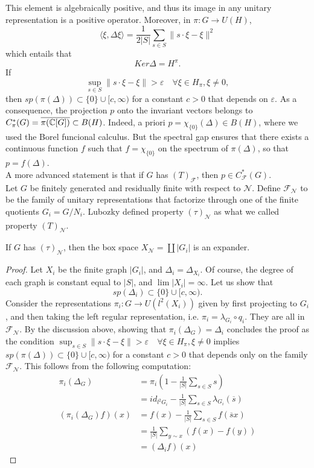 This element is algebraically positive, and thus its image in any unitary representation is a positive operator. Moreover, in $\pi : G\rightarrow U(H)$,
\[ \langle \xi , \Delta \xi \rangle = \frac{1}{2|S|} \sum_{s\in S} \|s\cdot \xi - \xi\|^2 \]
which entails that 
\[Ker \Delta = H^\pi.\]
If 
\[\sup_{s\in S} \|s\cdot \xi - \xi\| >\varepsilon \quad \forall \xi \in H_\pi , \xi \ne 0,\] 
then $sp(\pi(\Delta))\subset \{0\}\cup [c, \infty)$ for a constant $c>0$ that depends on $\varepsilon$. As a consequence, the projection $p$ onto the invariant vectors belongs to $C^*_\pi(G)= \overline{\pi(\mathbb C[G])}\subset B(H)$. Indeed, a priori $p = \chi_{\{0\}}(\Delta)\in B(H)$, where we used the Borel funcional calculus. But the spectral gap ensures that there exists a continuous function $f$ such that $f= \chi_{\{0\}}$ on the spectrum of $\pi(\Delta)$, so that $p=f(\Delta)$.\\

A more advanced statement is that if $G$ has $(T)_{\mathcal F}$, then $p\in C^*_{\mathcal F}(G)$. \\

Let $G$ be finitely generated and residually finite with respect to $\mathcal N$. Define $\mathcal F_{\mathcal N}$ to be the family of unitary representations that factorize through one of the finite quotients $G_i = G/ N_i$. Lubozky defined property $(\tau)_{\mathcal N}$ as what we called property $(T)_{\mathcal N}$.

\begin{prop}
If $G$ has $(\tau)_{\mathcal N}$, then the box space $X_{\mathcal N}= \coprod |G_i|$ is an expander. \end{prop}
\begin{proof}
Let $X_i$ be the finite graph $|G_i|$, and $\Delta_i = \Delta_{X_i}$. Of course, the degree of each graph is constant equal to $|S|$, and $\lim |X_i| = \infty$. Let us show that 
\[sp(\Delta_i )\subset \{0\} \cup [c , \infty).\]
Consider the representations $\pi_i : G\rightarrow U(l^2(X_i))$ given by first projecting to $G_i$, and then taking the left regular representation, i.e. $\pi_i = \lambda_{G_i}\circ q_i$. They are all in  $\mathcal F_{\mathcal N}$. By the discussion above, showing that $\pi_i(\Delta_G)= \Delta_i$ concludes the proof as the condition $\sup_{s\in S} \|s\cdot \xi - \xi\| >\varepsilon \quad \forall \xi \in H_\pi , \xi \ne 0$ implies $sp(\pi(\Delta))\subset \{0\}\cup [c, \infty)$ for a constant $c>0$ that depends only on the family $\mathcal F_{\mathcal N}$. This follows from the following computation:
\[\begin{split}
\pi_i(\Delta_G) & = \pi_i( 1 - \frac{1}{|S|}\sum_{s\in S}s )\\
 & =id_{l^2G_i} - \frac{1}{|S|}\sum_{s\in S}\lambda_{G_i}(\overline s) \\  
(\pi_i(\Delta_G)f)(x) & = f(x)-\frac{1}{|S|}\sum_{s\in S} f(\overline s x) \\
						& = \frac{1}{|S|}\sum_{y\sim x }(f(x)-f(y))\\
						&  = (\Delta_i f)(x)
\end{split}\]
\end{proof}

